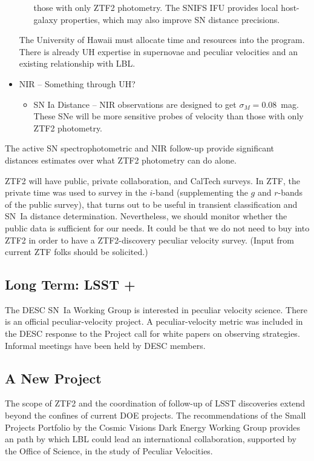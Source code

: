 \documentclass[11pt, oneside]{article}   	%
\begin{document}
\begin{itemize}
\begin{itemize}
those with only ZTF2 photometry.  The SNIFS IFU provides local host-galaxy properties, which may also improve SN distance precisions.
\end{itemize}
The University of Hawaii must allocate time and resources into the program.  There is already UH expertise in supernovae and peculiar velocities and an existing relationship
with LBL.
\item NIR -- Something through UH?
\begin{itemize}
\item SN Ia Distance -- NIR observations are designed to get $\sigma_M=0.08$~mag.  These SNe will be more sensitive probes of velocity
than those with only ZTF2 photometry.
\end{itemize}
\end{itemize}
The active SN spectrophotometric and NIR follow-up provide significant distances estimates over
what ZTF2 photometry can do alone.




ZTF2 will have public, private collaboration, and CalTech surveys.    In ZTF,
the private time was used to survey in the $i$-band (supplementing the $g$ and $r$-bands of the public survey), that turns out to be useful in transient classification and SN~Ia distance determination.
Nevertheless, we should monitor whether the public data is sufficient for our needs.  It could be that we do not need to buy into ZTF2 in order to have
a ZTF2-discovery peculiar velocity survey.  (Input from current ZTF folks should be solicited.)

\subsection{Long Term: LSST +}
The DESC SN~Ia Working Group is interested in peculiar velocity science.  There is an official peculiar-velocity project.  A peculiar-velocity
metric was included in the DESC response to the Project call for white papers on observing strategies.
Informal meetings have been held by DESC members.

\subsection{A New Project}
The scope of ZTF2 and the coordination of follow-up of LSST discoveries extend beyond the confines
of current DOE projects.  The recommendations
of the  Small Projects Portfolio  by the  Cosmic Visions Dark Energy Working Group
provides an path by which LBL could lead an international collaboration,
supported by the Office of Science, in the study of Peculiar Velocities.
\end{document}
